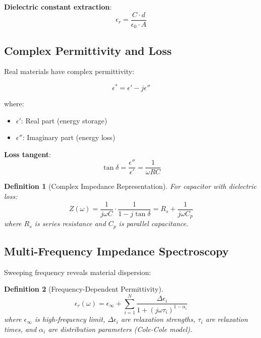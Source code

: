 \documentclass[12pt,a4paper]{article}
\newtheorem{definition}{Definition}
\begin{document}
\textbf{Dielectric constant extraction}:
\begin{equation}
\epsilon_r = \frac{C \cdot d}{\epsilon_0 \cdot A}
\end{equation}

\subsection{Complex Permittivity and Loss}

Real materials have complex permittivity:

\begin{equation}
\epsilon^* = \epsilon' - j\epsilon''
\end{equation}

where:
\begin{itemize}
\item $\epsilon'$: Real part (energy storage)
\item $\epsilon''$: Imaginary part (energy loss)
\end{itemize}

\textbf{Loss tangent}:
\begin{equation}
\tan\delta = \frac{\epsilon''}{\epsilon'} = \frac{1}{\omega R C}
\end{equation}

\begin{definition}[Complex Impedance Representation]
For capacitor with dielectric loss:
\begin{equation}
Z(\omega) = \frac{1}{j\omega C} \cdot \frac{1}{1 - j\tan\delta} = R_s + \frac{1}{j\omega C_p}
\end{equation}
where $R_s$ is series resistance and $C_p$ is parallel capacitance.
\end{definition}

\subsection{Multi-Frequency Impedance Spectroscopy}

Sweeping frequency reveals material dispersion:

\begin{definition}[Frequency-Dependent Permittivity]
\begin{equation}
\epsilon_r(\omega) = \epsilon_{\infty} + \sum_{i=1}^{N} \frac{\Delta \epsilon_i}{1 + (j\omega\tau_i)^{1-\alpha_i}}
\end{equation}
where $\epsilon_{\infty}$ is high-frequency limit, $\Delta \epsilon_i$ are relaxation strengths, $\tau_i$ are relaxation times, and $\alpha_i$ are distribution parameters (Cole-Cole model).
\end{definition}
\end{document}
